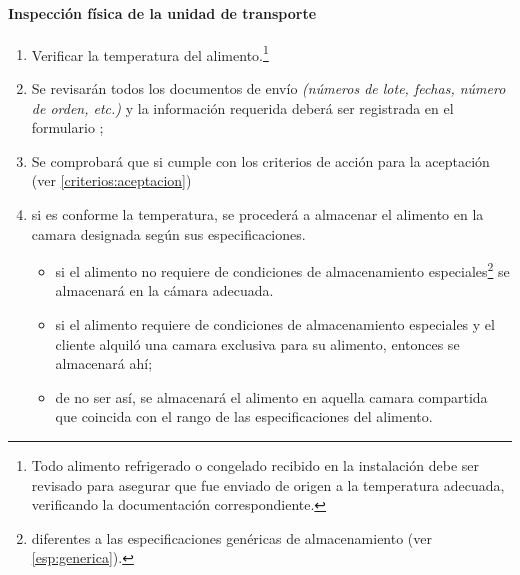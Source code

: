\paragraph{Inspección física de la unidad de transporte}\label{sec:IsnpeccionTransporte}
\begin{enumerate}
\item Verificar la temperatura del alimento.\footnote{Todo alimento refrigerado o congelado recibido en la instalación debe ser revisado para asegurar que fue enviado de origen a la temperatura adecuada, verificando la documentación correspondiente.}
    \item Se revisarán todos los documentos de envío \emph{(números de lote, fechas, número de orden, etc.)} y la información requerida deberá ser registrada en el formulario \Oent;
    \item Se comprobará que si cumple con los criterios de acción para la aceptación (ver \cref{criterios:aceptacion})
    \item si es conforme la temperatura, se procederá a almacenar el alimento en la camara designada según sus especificaciones.
          \begin{itemize}
              \item si el \gls{alimento} no requiere de condiciones de almacenamiento especiales\footnote{diferentes a las especificaciones genéricas de almacenamiento (ver \cref{esp:generica}).} se almacenará en la cámara adecuada.
              \item si el \gls{alimento} requiere de condiciones de almacenamiento especiales y el cliente alquiló una camara exclusiva para su alimento, entonces se almacenará ahí;
              \item de no ser así, se almacenará el \gls{alimento} en aquella camara compartida que coincida con el rango de las especificaciones del alimento.
          \end{itemize}
\end{enumerate}